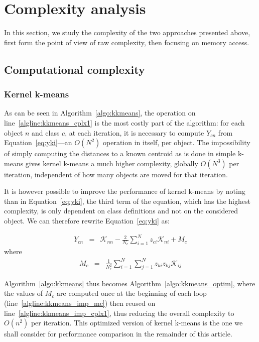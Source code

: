 \documentclass[a4paper,twoside]{article}
\newcommand{\cad}{---} %
\begin{document}
\section{Complexity analysis}
\label{sec:complexity}

In this section, we study the complexity of the two approaches presented above, first form the point of view of raw complexity, then focusing on memory access.

\subsection{Computational complexity}

\subsubsection{Kernel k-means}

As can be seen in Algorithm~\ref{algo:kkmeans}, the operation on line~\ref{algline:kkmeans_cplx1} is the most costly part of the algorithm: for each object $n$ and class $c$, at each iteration, it is necessary to compute $Y_{cn}$ from Equation~\ref{eq:yki}\cad{}an $O(N^2)$ operation in itself, per object. The impossibility of simply computing the distances to a known centroid as is done in simple k-means gives kernel k-means a much higher complexity, globally $O(N^3)$ per iteration, independent of how many objects are moved for that iteration.

It is however possible to improve the performance of kernel k-means by noting than in Equation~\ref{eq:yki}, the third term of the equation, which has the highest complexity, is only dependent on class definitions and not on the considered object. We can therefore rewrite Equation~\ref{eq:yki} as:

\begin{eqnarray}
Y_{cn} & = & \mathcal{K}_{nn} - \frac{2}{N_c} \sum_{i=1}^{N} z_{ci} \mathcal{K}_{ni} + M_c \label{eq:yki_improved}
\end{eqnarray}
where
\begin{eqnarray}
M_c    & = & \frac{1}{N_c^2} \sum_{i=1}^{N} \sum_{j=1}^{N} z_{ki} z_{kj} \mathcal{K}_{ij} \label{eq:mc}
\end{eqnarray}

Algorithm~\ref{algo:kkmeans} thus becomes Algorithm~\ref{algo:kkmeans_optim}, where the values of $M_c$ are computed once at the beginning of each loop (line~\ref{algline:kkmeans_imp_mc}) then reused on line~\ref{algline:kkmeans_imp_cplx1}, thus reducing the overall complexity to $O(n^2)$ per iteration. This optimized version of kernel k-means is the one we shall consider for performance comparison in the remainder of this article.
\end{document}
